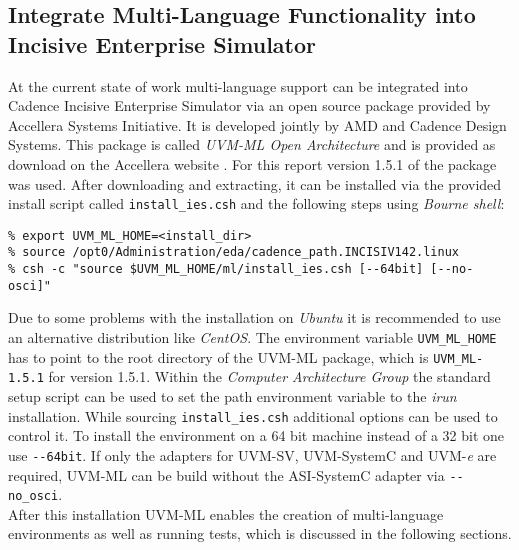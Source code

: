 \subsection{Integrate Multi-Language Functionality into Incisive Enterprise
Simulator}
At the current state of work multi-language support can be integrated into Cadence Incisive Enterprise Simulator via an open source package provided by Accellera Systems Initiative. It is developed jointly by AMD and Cadence Design
Systems. This package is called \emph{UVM-ML Open Architecture} and is provided as download on the Accellera website \cite{uvm_ml}.
For this report version 1.5.1 of the package was used. After downloading and extracting, it can be
installed via the provided install script called \lstinline$install_ies.csh$ and the following steps using \emph{Bourne shell}:

\medskip
{}
\begin{lstlisting}
% export UVM_ML_HOME=<install_dir>
% source /opt0/Administration/eda/cadence_path.INCISIV142.linux
% csh -c "source $UVM_ML_HOME/ml/install_ies.csh [--64bit] [--no-osci]"
\end{lstlisting} 
\medskip 

Due to some problems with the installation on \emph{Ubuntu} it is recommended to use an alternative distribution like
\emph{CentOS}. The environment variable \lstinline$UVM_ML_HOME$ has to point to the root directory of the UVM-ML
package, which is \lstinline$UVM_ML-1.5.1$ for version 1.5.1. Within the \emph{Computer Architecture Group} the standard setup script can be used
to set the path environment variable to the \emph{irun} installation. While sourcing
\lstinline$install_ies.csh$ additional options can be used to control it. To install the environment on a 64 bit machine
instead of a 32 bit one use \lstinline$--64bit$. If only the adapters for UVM-SV, UVM-SystemC and
UVM-\textit{e} are required, UVM-ML can be build without the ASI-SystemC adapter via \lstinline$--no_osci$.\\
After this installation UVM-ML enables the creation of multi-language environments as well as running tests, which is
discussed in the following sections.